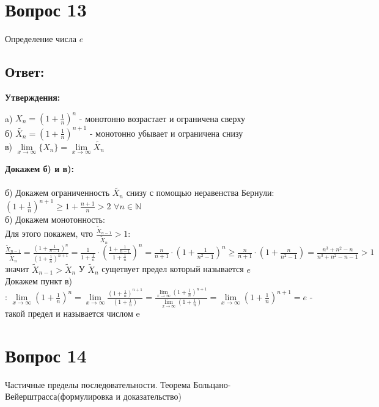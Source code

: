 \documentclass{article}
\begin{document}
\section*{Вопрос 13}
\begin{center}
Определение числа $e$
\end{center}
\subsection*{Ответ:}
\textbf{Утверждения:}\\
\begin{center}
a) $X_n = (1 + \frac{1}{n})^n $ - монотонно возрастает и ограничена сверху\\
б)  $\widetilde{X_n} = (1 + \frac{1}{n})^{n+1}$ - монотонно убывает и ограничена снизу\\
в) $\lim\limits_{x\to \infty} \{X_n\} = \lim\limits_{x\to \infty} \widetilde{X_n}$
\end{center}
\textbf{Докажем б) и в):}\\ \\
б) Докажем ограниченность $\widetilde{X_n}$ снизу с помощью неравенства Бернули: $(1 + \frac{1}{n})^{n+1} \geq 1 + \frac{n + 1}{n} > 2$ $\forall n \in \mathbb{N}$ \\
б) Докажем монотонность:\\
Для этого покажем, что $\frac{\widetilde{X}_{n-1}}{\widetilde{X}_n} > 1$: $\frac{\widetilde{X}_{n-1}}{\widetilde{X}_n} = \frac{(1 + \frac{1}{n - 1})^{n}}{(1 + \frac{1}{n})^{n+1}} =
\frac{1}{1 + \frac{1}{n}} \cdot \left(\frac{1 + \frac{1}{n - 1}}{1 + \frac{1}{n}}\right) ^ n = \frac{n}{n + 1} \cdot \left( 1 + \frac{1}{n^2-1}\right)^n \geq \frac{n}{n + 1} \cdot \left( 1 + \frac{n}{n^2-1}\right) = \frac{n^3+n^2-n}{n^3+n^2-n-1} > 1$ значит $\widetilde{X}_{n - 1} > \widetilde{X}_{n}$ У $\widetilde{X}_{n}$ сущетвует предел который называется $e$\\
Докажем пункт в)\\: $\lim\limits_{x\to \infty} (1 + \frac{1}{n})^n = \lim\limits_{x\to \infty} \frac{(1 + \frac{1}{n})^{n+1}}{(1 + \frac{1}{n})} = \frac{\lim\limits_{x\to \infty} (1 + \frac{1}{n})^{n+1}}{\lim\limits_{x\to \infty} (1 + \frac{1}{n})} = \lim\limits_{x\to \infty} (1 + \frac{1}{n})^{n+1} = e$ - такой предел и называется числом e
\section*{Вопрос 14}
\begin{center}
Частичные пределы последовательности. Теорема Больцано-Вейерштрасса(формулировка и доказательство)
\end{center}
\end{document}
